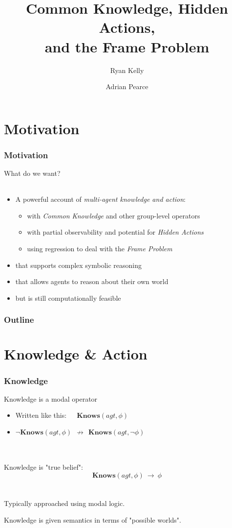 \documentclass{beamer}
\title{Common Knowledge, Hidden Actions,\\ and the Frame Problem}
\author[Ryan Kelly (rfk@csse.unimelb.edu.au)]{Ryan Kelly \and Adrian Pearce}
\begin{document}
\begin{frame}
  \titlepage
\end{frame}

\section{Motivation}

\begin{frame}
\frametitle{Motivation}
What do we want?\ \\
\ \\
\begin{itemize}
\item A powerful account of \emph{multi-agent knowledge and action}:
  \begin{itemize}
    \item with \emph{Common Knowledge} and other group-level operators
    \item with partial observability and potential for \emph{Hidden Actions}
    \item using regression to deal with the \emph{Frame Problem}
  \end{itemize}
\item that supports complex symbolic reasoning
\item that allows agents to reason about their own world
\item but is still computationally feasible
\end{itemize}
\end{frame}

\begin{frame}
  \frametitle{Outline}
  \tableofcontents
\end{frame}

\section{Knowledge \& Action}

\begin{frame}
\frametitle{Knowledge}

Knowledge is a modal operator
\begin{itemize}
\item Written like this:\ \ \  $\mathbf{Knows}(agt,\phi)$
\item $\neg\mathbf{Knows}(agt,\phi)\ \ \not\rightarrow\ \ \mathbf{Knows}(agt,\neg\phi)$
\end{itemize}
\ \\
\ \\
Knowledge is "true belief":
\[ \mathbf{Knows}(agt,\phi)\ \rightarrow\ \phi \]
\ \\
\ \\
Typically approached using modal logic.

Knowledge is given semantics in terms of "possible worlds".

\end{frame}
\end{document}
